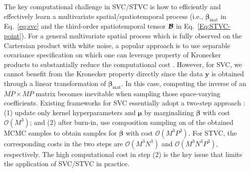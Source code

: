 \documentclass[12pt]{article}
\newcommand{\bd}[1]{\boldsymbol{#1}}
\begin{document}
The key computational challenge in SVC/STVC is how to efficiently and effectively learn a multivariate spatial/spatiotemporal process (i.e., $\bd{\beta}_{\text{mat}}$ in Eq.~\eqref{eq:svc} and the third-order spatiotemporal tensor $\bd{\cal{B}}$ in Eq.~\eqref{Eq:STVC-point}). For a general multivariate spatial process which is fully observed on the Cartersian product with white noise, a popular approach is to use separable covariance specification on which one can leverage property of Kronecker products to substantially reduce the computational cost \citep{saatcci2012scalable, wilson2014fast}. However, for SVC, we cannot benefit from the Kronecker property directly since the data $\bd{y}$ is obtained through a linear transformation of $\bd{\beta}_{\text{mat}}$. In this case, computing the inverse of an $MP\times MP$ matrix becomes inevitable when sampling those space-varying coefficients. Existing frameworks for SVC essentially adopt a two-step approach \citep{gelfand2003spatial,finley2020bayesian}: (1) update only kernel hyperparameters and $\bd{\mu}$ by marginalizing $\bd{\beta}$ with cost $\mathcal{O}\left(M^3\right)$; and 
(2) after burn-in, use composition sampling on of the obtained MCMC samples to obtain samples for $\bd{\beta}$ with cost $\mathcal{O}\left(M^3P^3\right)$. For STVC, the corresponding costs in the two steps are $\mathcal{O}\left(M^3N^3\right)$ and $\mathcal{O}\left(M^3N^3 P^3\right)$, respectively. The high computational cost in step (2) is the key issue that limits the application of SVC/STVC in practice. 
\end{document}
